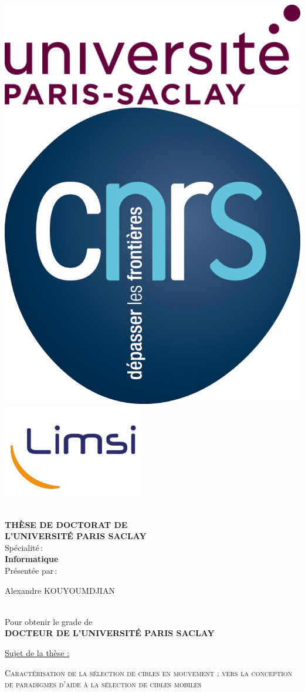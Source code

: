 \begin{titlepage}

\includegraphics[height=2.cm]{./figures/garde/logo_paris_saclay}\hfill
\includegraphics[height=2.cm]{./figures/garde/logo_CNRS}\hfill
\includegraphics[height=2.cm]{./figures/garde/limsilogo_new_transparent_crop}\hfill
\\
\\


\begin{center}
 \textbf{THÈSE DE DOCTORAT DE\\ L'UNIVERSITÉ PARIS SACLAY\\}
Spécialité\,:\\
\textbf{Informatique}\\ 
Présentée par\,:\\ 
\begin{LARGE}
Alexandre KOUYOUMDJIAN\end{LARGE}\\
Pour obtenir le grade de\\
\textbf{DOCTEUR DE L'UNIVERSITÉ PARIS SACLAY}
\end{center}

\noindent \underline{Sujet de la thèse :}\\
\begin{center}
\begin{Large}
{\textsc{Caractérisation de la sélection de cibles en mouvement : vers la conception de paradigmes d'aide à la sélection de cibles mobiles}}
\end{Large}
\end{center}


\end{titlepage}
